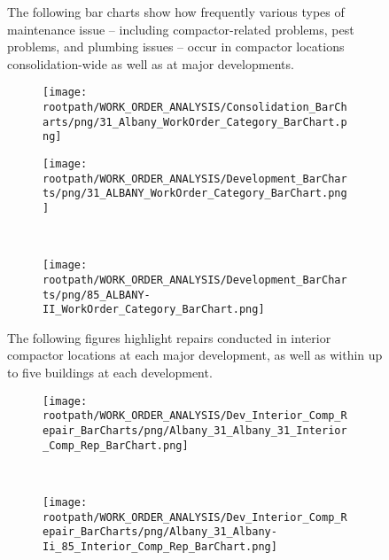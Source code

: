\begin{figure}[h]
                                \sf
                                The following bar charts show how frequently various types of maintenance issue -- including compactor-related problems, pest problems, and plumbing issues -- occur in compactor locations consolidation-wide as well as at major developments.
                                \raggedright
                                \begin{subfigure}{\textwidth}
                                \texttt{[image: \\rootpath/WORK\_ORDER\_ANALYSIS/Consolidation\_BarCharts/png/31\_Albany\_WorkOrder\_Category\_BarChart.png]}
                                \end{subfigure}
                                
                                        \begin{subfigure}{0.45\textwidth}
                                        \texttt{[image: \\rootpath/WORK\_ORDER\_ANALYSIS/Development\_BarCharts/png/31\_ALBANY\_WorkOrder\_Category\_BarChart.png]}
                                        \end{subfigure}
                                        ~
                                        \begin{subfigure}{0.45\textwidth}
                                        \texttt{[image: \\rootpath/WORK\_ORDER\_ANALYSIS/Development\_BarCharts/png/85\_ALBANY-II\_WorkOrder\_Category\_BarChart.png]}
                                        \end{subfigure}
                                        
                                        \end{figure}
\begin{figure}[h]
                                \raggedright
                                \sf
                                The following figures highlight repairs conducted in interior compactor locations at each major development, as well as within up to five buildings at each development.\\
                                \begin{subfigure}{0.45\textwidth}
                                        \texttt{[image: \\rootpath/WORK\_ORDER\_ANALYSIS/Dev\_Interior\_Comp\_Repair\_BarCharts/png/Albany\_31\_Albany\_31\_Interior\_Comp\_Rep\_BarChart.png]}
                                        \end{subfigure}
                                        ~
                                        \begin{subfigure}{0.45\textwidth}
                                        \texttt{[image: \\rootpath/WORK\_ORDER\_ANALYSIS/Dev\_Interior\_Comp\_Repair\_BarCharts/png/Albany\_31\_Albany-Ii\_85\_Interior\_Comp\_Rep\_BarChart.png]}
                                        \end{subfigure}
                                        
                                        
\end{figure}
